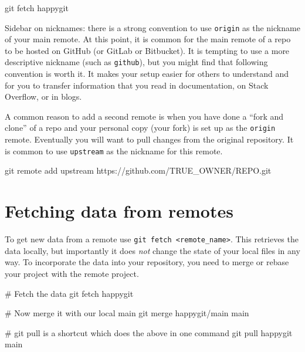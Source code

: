 \documentclass[
]{book}
\newenvironment{Shaded}{\begin{snugshade}}{\end{snugshade}}
\newcommand{\NormalTok}[1]{#1}
\begin{document}
\begin{Shaded}
\begin{Highlighting}[]
\NormalTok{git fetch happygit}
\end{Highlighting}
\end{Shaded}

Sidebar on nicknames: there is a strong convention to use \texttt{origin} as the nickname of your main remote.
At this point, it is common for the main remote of a repo to be hosted on GitHub (or GitLab or Bitbucket).
It is tempting to use a more descriptive nickname (such as \texttt{github}), but you might find that following convention is worth it.
It makes your setup easier for others to understand and for you to transfer information that you read in documentation, on Stack Overflow, or in blogs.

A common reason to add a second remote is when you have done a ``fork and clone'' of a repo and your personal copy (your fork) is set up as the \texttt{origin} remote.
Eventually you will want to pull changes from the original repository. It is common to use \texttt{upstream} as the nickname for this remote.

\begin{Shaded}
\begin{Highlighting}[]
\NormalTok{git remote add upstream https://github.com/TRUE\_OWNER/REPO.git}
\end{Highlighting}
\end{Shaded}

\section{Fetching data from remotes}\label{fetching-data-from-remotes}

To get new data from a remote use \texttt{git\ fetch\ \textless{}remote\_name\textgreater{}}.
This retrieves the data locally, but importantly it does \emph{not} change the state of your local files in any way.
To incorporate the data into your repository, you need to merge or rebase your project with the remote project.

\begin{Shaded}
\begin{Highlighting}[]
\NormalTok{\# Fetch the data}
\NormalTok{git fetch happygit}

\NormalTok{\# Now merge it with our local main}
\NormalTok{git merge happygit/main main}

\NormalTok{\# git pull is a shortcut which does the above in one command}
\NormalTok{git pull happygit main}
\end{Highlighting}
\end{Shaded}
\end{document}

